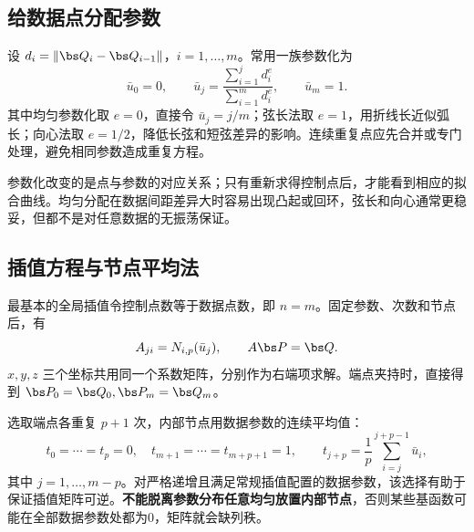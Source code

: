\subsection{给数据点分配参数}
设 $d_i=\|\bs Q_i-\bs Q_{i-1}\|$，$i=1,\ldots,m$。常用一族参数化为
\[
 \bar u_0=0,\qquad
 \bar u_j=\frac{\sum_{i=1}^jd_i^e}{\sum_{i=1}^md_i^e},\qquad
 \bar u_m=1.
\]
其中均匀参数化取 $e=0$，直接令 $\bar u_j=j/m$；弦长法取 $e=1$，用折线长近似弧长；向心法取 $e=1/2$，降低长弦和短弦差异的影响。连续重复点应先合并或专门处理，避免相同参数造成重复方程。



参数化改变的是点与参数的对应关系；只有重新求得控制点后，才能看到相应的拟合曲线。均匀分配在数据间距差异大时容易出现凸起或回环，弦长和向心通常更稳妥，但都不是对任意数据的无振荡保证。

\subsection{插值方程与节点平均法}
最基本的全局插值令控制点数等于数据点数，即 $n=m$。固定参数、次数和节点后，有
\[
 A_{ji}=N_{i,p}(\bar u_j),\qquad A\bs P=\bs Q.
\]
$x,y,z$ 三个坐标共用同一个系数矩阵，分别作为右端项求解。端点夹持时，直接得到 $\bs P_0=\bs Q_0,\bs P_m=\bs Q_m$。

选取端点各重复 $p+1$ 次，内部节点用数据参数的连续平均值：
\[
 t_0=\cdots=t_p=0,\quad t_{m+1}=\cdots=t_{m+p+1}=1,
 \qquad t_{j+p}=\frac1p\sum_{i=j}^{j+p-1}\bar u_i,
\]
其中 $j=1,\ldots,m-p$。对严格递增且满足常规插值配置的数据参数，该选择有助于保证插值矩阵可逆。\textbf{不能脱离参数分布任意均匀放置内部节点}，否则某些基函数可能在全部数据参数处都为0，矩阵就会缺列秩。


